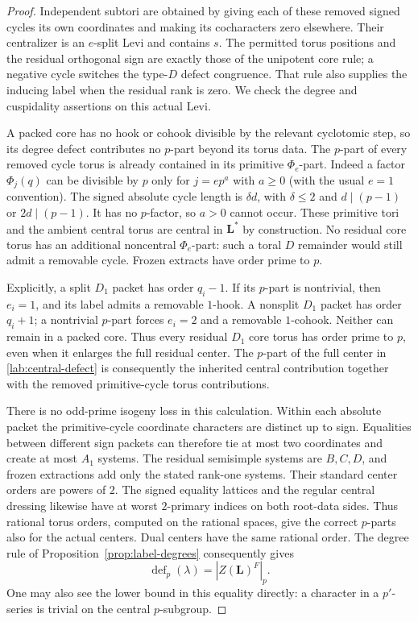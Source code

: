 \begin{proof}
Independent subtori are obtained by giving each of these removed
signed cycles its own coordinates and making its cocharacters
zero elsewhere.  Their centralizer is an $e$-split Levi and
contains $s$.  The permitted torus positions and the residual
orthogonal sign are exactly those of the unipotent core
rule; a negative cycle switches the type-$D$ defect congruence.
That rule also supplies the inducing label when the residual
rank is zero.  We check the degree and cuspidality assertions
on this actual Levi.

A packed core has no hook or cohook divisible by the relevant
cyclotomic step, so its degree defect contributes no $p$-part
beyond its torus data.  The $p$-part of every removed cycle
torus is already contained in its primitive $\Phi_e$-part.
Indeed a factor $\Phi_j(q)$ can be divisible by $p$ only for
$j=e p^a$ with $a\ge0$ (with the usual $e=1$ convention).
The signed absolute cycle length is $\delta d$, with
$\delta\le2$ and $d\mid(p-1)$ or $2d\mid(p-1)$.
It has no $p$-factor, so $a>0$ cannot occur.  These primitive
tori and the ambient central torus are central in
$\mathbf L^*$ by construction.  No residual core torus
has an additional noncentral $\Phi_e$-part: such a toral
$D$ remainder would still admit a removable cycle.  Frozen
extracts have order prime to $p$.

Explicitly, a split $D_1$ packet has order $q_i-1$.
If its $p$-part is nontrivial, then $e_i=1$, and its label
admits a removable $1$-hook.  A nonsplit $D_1$ packet has
order $q_i+1$; a nontrivial $p$-part forces $e_i=2$ and
a removable $1$-cohook.  Neither can remain in a packed
core.  Thus every residual $D_1$ core torus has order
prime to $p$, even when it enlarges the full residual
center.  The $p$-part of the full center in
\eqref{lab:central-defect} is consequently the inherited
central contribution together with the removed primitive-cycle
torus contributions.

There is no odd-prime isogeny loss in this calculation.
Within each absolute packet the primitive-cycle coordinate
characters are distinct up to sign.  Equalities between
different sign packets can therefore tie at most two
coordinates and create at most $A_1$ systems.  The residual
semisimple systems are $B,C,D$, and frozen extractions add
only the stated rank-one systems.  Their standard center
orders are powers of $2$.  The signed equality lattices and
the regular central dressing likewise have at worst
$2$-primary indices on both root-data sides.  Thus rational
torus orders, computed on the rational spaces, give the
correct $p$-parts also for the actual centers.  Dual centers
have the same rational order.  The degree rule of
Proposition~\ref{prop:label-degrees} consequently gives
\begin{equation}\label{lab:central-defect}
 \operatorname{def}_p(\lambda)=|Z(\mathbf L)^F|_p.
\end{equation}
One may also see the lower bound in this equality directly:
a character in a $p'$-series is trivial on the central
$p$-subgroup.


\end{proof}
